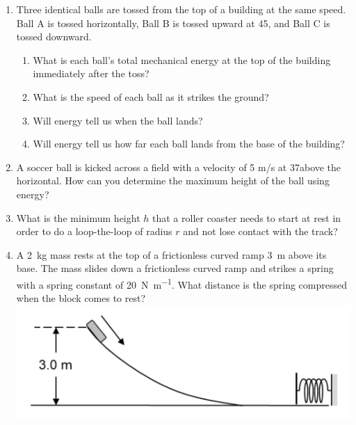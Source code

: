 \begin{enumerate}
\item 
Three identical balls are tossed from the top of a building at the same speed. Ball A is tossed horizontally, Ball B is tossed upward at 45\degree, and Ball C is tossed downward.
\begin{enumerate}
	\item What is each ball’s total mechanical energy at the top of the building immediately after the toss? \bigskip
	\item What is the speed of each ball as it strikes the ground? \bigskip
	\item Will energy tell us when the ball lands? \bigskip
	\item Will energy tell us how far each ball lands from the base of the building?
\end{enumerate}

\item 
A soccer ball is kicked across a field with a velocity of 5 m/s at 37\degree above the horizontal. How can you determine the maximum height of the ball using energy?


\item What is the minimum height $h$ that a roller coaster needs to start at rest in order to do a loop-the-loop of radius $r$ and not lose contact with the track? \hugeskip




\item 
A \SI{2}{\kilo\gram} mass rests at the top of a frictionless curved ramp \SI{3}{\meter} above its base. The mass slides down a frictionless curved ramp and strikes a spring with a spring constant of \SI{20}{\newton \per \meter}. What distance is the spring compressed when the block comes to rest?
\\
\includegraphics[scale=0.1]{week7-spring-mass-hill}


\end{enumerate}